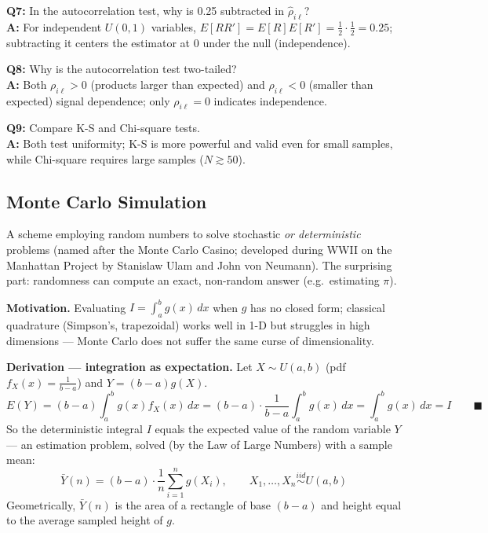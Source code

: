 \begin{qabox}
\textbf{Q7:} In the autocorrelation test, why is 0.25 subtracted in $\hat\rho_{i\ell}$? \\
\textbf{A:} For independent $U(0,1)$ variables, $E[RR']=E[R]E[R']=\tfrac12\cdot\tfrac12=0.25$; subtracting it centers the estimator at 0 under the null (independence).

\textbf{Q8:} Why is the autocorrelation test two-tailed? \\
\textbf{A:} Both $\rho_{i\ell}>0$ (products larger than expected) and $\rho_{i\ell}<0$ (smaller than expected) signal dependence; only $\rho_{i\ell}=0$ indicates independence.

\textbf{Q9:} Compare K-S and Chi-square tests. \\
\textbf{A:} Both test uniformity; K-S is more powerful and valid even for small samples, while Chi-square requires large samples ($N\gtrsim50$).
\end{qabox}

\subsection{Monte Carlo Simulation}

\begin{defbox}
A scheme employing random numbers to solve stochastic \emph{or deterministic} problems (named after the Monte Carlo Casino; developed during WWII on the Manhattan Project by Stanislaw Ulam and John von Neumann). The surprising part: randomness can compute an exact, non-random answer (e.g.\ estimating $\pi$).
\end{defbox}

\textbf{Motivation.} Evaluating $I=\int_a^b g(x)\,dx$ when $g$ has no closed form; classical quadrature (Simpson's, trapezoidal) works well in 1-D but struggles in high dimensions — Monte Carlo does not suffer the same curse of dimensionality.

\begin{examplebox}
\textbf{Derivation — integration as expectation.} Let $X\sim U(a,b)$ (pdf $f_X(x)=\tfrac{1}{b-a}$) and $Y=(b-a)g(X)$.
\[
E(Y) = (b-a)\int_a^b g(x)f_X(x)\,dx = (b-a)\cdot\frac{1}{b-a}\int_a^b g(x)\,dx = \int_a^b g(x)\,dx = I \qquad\blacksquare
\]
So the deterministic integral $I$ equals the expected value of the random variable $Y$ — an estimation problem, solved (by the Law of Large Numbers) with a sample mean:
\[
\bar Y(n) = (b-a)\cdot\frac1n\sum_{i=1}^n g(X_i), \qquad X_1,\dots,X_n \stackrel{iid}{\sim} U(a,b)
\]
Geometrically, $\bar Y(n)$ is the area of a rectangle of base $(b-a)$ and height equal to the average sampled height of $g$.
\end{examplebox}

